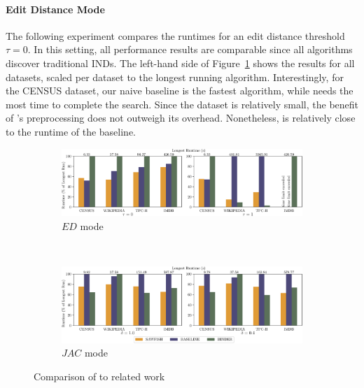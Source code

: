 \paragraph{Edit Distance Mode}
The following experiment compares the runtimes for an edit distance threshold $\tau = 0$. In this setting, all performance results are comparable since all algorithms discover traditional INDs.
The left-hand side of Figure~\ref{fig:eval:comparsion_ed} shows the results for all datasets, scaled per dataset to the longest running algorithm.
Interestingly, for the CENSUS dataset, our naive baseline is the fastest algorithm, while  needs the most time to complete the search.
Since the dataset is relatively small, the benefit of \sawfish's preprocessing does not outweigh its overhead.
Nonetheless, \sawfish is relatively close to the runtime of the baseline.

\begin{figure}[ht]
    \centering
    \begin{subfigure}[b]{\textwidth}
        \centering
        \includegraphics[width=\textwidth]{figures/evaluation/competitor_bars-crop.pdf}
        \caption{$ED$ mode}
        \label{fig:eval:comparsion_ed}
    \end{subfigure}\\
    \begin{subfigure}[b]{\textwidth}
        \centering
        \includegraphics[width=\textwidth]{figures/evaluation/competitor_bars_token-crop.pdf}
        \caption{$JAC$ mode}
        \label{fig:eval:comparison_jac}
    \end{subfigure}
    \caption{Comparison of \sawfish to related work}
\end{figure}

